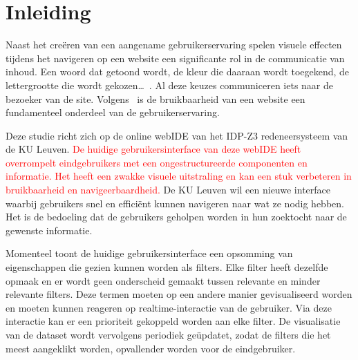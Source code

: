 \section{Inleiding}%
\label{sec:inleiding}

Naast het creëren van een aangename gebruikerservaring spelen visuele effecten tijdens het navigeren op een website een significante rol in de communicatie van inhoud. Een woord dat getoond wordt, de kleur die daaraan wordt toegekend, de lettergrootte die wordt gekozen…~\autocite{Bordbar2016}. Al deze keuzes communiceren iets naar de bezoeker van de site. Volgens~\textcite{Lee2012} is de bruikbaarheid van een website een fundamenteel onderdeel van de gebruikerservaring. 

Deze studie richt zich op de online webIDE van het IDP-Z3 redeneersysteem van de KU Leuven. \textcolor{red}{De huidige gebruikersinterface van deze webIDE heeft overrompelt eindgebruikers met een ongestructureerde componenten en informatie. Het heeft een zwakke visuele uitstraling en kan een stuk verbeteren in bruikbaarheid en navigeerbaardheid.} De KU Leuven wil een nieuwe interface waarbij gebruikers snel en efficiënt kunnen navigeren naar wat ze nodig hebben. Het is de bedoeling dat de gebruikers geholpen worden in hun zoektocht naar de gewenste informatie.


Momenteel toont de huidige gebruikersinterface een opsomming van eigenschappen die gezien kunnen worden als filters. Elke filter heeft dezelfde opmaak en er wordt geen onderscheid gemaakt tussen relevante en minder relevante filters. Deze termen moeten op een andere manier gevisualiseerd worden en moeten kunnen reageren op realtime-interactie van de gebruiker. Via deze interactie kan er een prioriteit gekoppeld worden aan elke filter. De visualisatie van de dataset wordt vervolgens periodiek geüpdatet, zodat de filters die het meest aangeklikt worden, opvallender worden voor de eindgebruiker.


